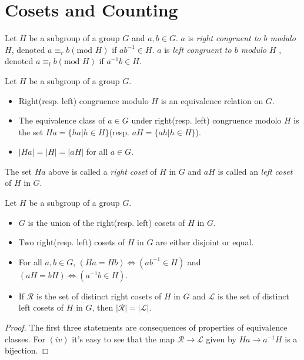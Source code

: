 \section{Cosets and Counting}
\begin{definition}
	Let $ H $ be a subgroup of a group $ G $ and $ a,b \in G $. $ a $ is \textit{right congruent to $ b $ modulo $ H $}, denoted $ a \equiv_r b (\text{mod }H) $ if $ a b^{-1}\in H $. $ a $ is \textit{left congruent to $ b $ modulo $ H $ }, denoted $ a \equiv_l b (\text{mod }H) $ if $  a^{-1}b\in H $.
\end{definition}
\begin{theorem}
	Let $ H $ be a subgroup of a group $ G $.
	\begin{itemize}
		\item Right(resp. left) congruence modulo $ H $ is an equivalence relation on $ G $.
		\item The equivalence class of $ a \in G $ under right(resp. left) congruence modolo $ H $ is the set $ Ha = \{ha |h\in H \} $(resp. $ aH = \{ah |h\in H \} $).
		\item $ |Ha| = |H| = |aH| $ for all $ a \in G $.
	\end{itemize}
\end{theorem}
\begin{definition}
	The set $ Ha $ above is called a \textit{right coset} of $ H $ in $ G $ and $ aH $ is called an \textit{left coset} of $ H $ in $ G $.
\end{definition}
\begin{Corollary}
	Let $ H $ be a subgroup of a group $ G $.
	\begin{itemize}
		\item  $ G $ is the union of the right(resp. left) cosets of $ H $ in $ G $.
		\item Two right(resp. left) cosets of $ H $ in $ G $ are either disjoint or equal.
		\item For all $ a,b\in G $, $ (Ha = Hb) \Leftrightarrow (a b^{-1}\in H)$ and $  (aH = bH) \Leftrightarrow ( a^{-1}b\in H) $.
		\item If $ \mathcal{R} $ is the set of distinct right cosets of $ H $ in $ G $ and $ \mathcal{L} $ is the set of distinct left cosets of $ H $ in $ G $, then $ |\mathcal{R}|=|\mathcal{L}| $.
	\end{itemize}
\end{Corollary}
\begin{proof}
	The first three statements are consequences of properties of equivalence classes. For $ (iv) $ it's easy to see that the map $ \mathcal{R}\to\mathcal{L} $ given by $ Ha \to a^{-1}H $ is a bijection.
\end{proof}
